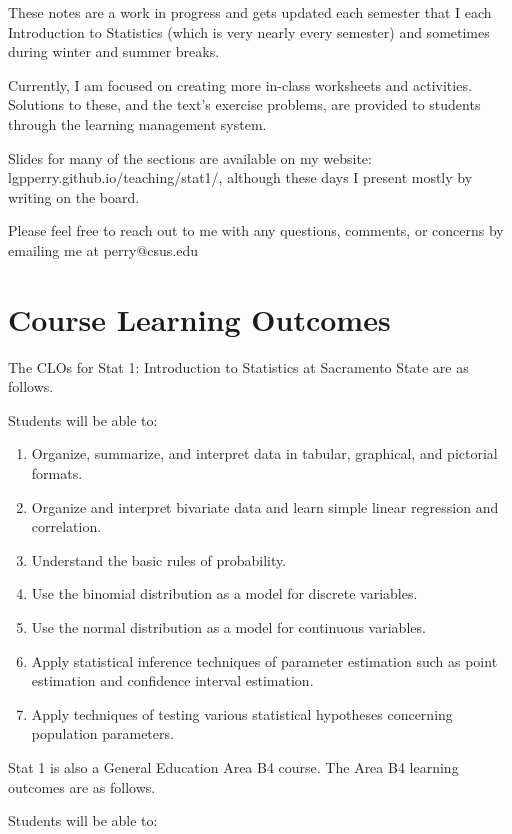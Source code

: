 \documentclass[
]{book}
\providecommand{\tightlist}{%
  \setlength{\itemsep}{0pt}\setlength{\parskip}{0pt}}
\begin{document}
These notes are a work in progress and gets updated each semester that I each Introduction to Statistics (which is very nearly every semester) and sometimes during winter and summer breaks.

Currently, I am focused on creating more in-class worksheets and activities. Solutions to these, and the text's exercise problems, are provided to students through the learning management system.

Slides for many of the sections are available on my website: lgpperry.github.io/teaching/stat1/, although these days I present mostly by writing on the board.

Please feel free to reach out to me with any questions, comments, or concerns by emailing me at perry@csus.edu

\section*{Course Learning Outcomes}\label{course-learning-outcomes}

The CLOs for Stat 1: Introduction to Statistics at Sacramento State are as follows.

Students will be able to:

\begin{enumerate}
\def\labelenumi{\arabic{enumi}.}
\tightlist
\item
  Organize, summarize, and interpret data in tabular, graphical, and pictorial formats.
\item
  Organize and interpret bivariate data and learn simple linear regression and correlation.
\item
  Understand the basic rules of probability.
\item
  Use the binomial distribution as a model for discrete variables.
\item
  Use the normal distribution as a model for continuous variables.
\item
  Apply statistical inference techniques of parameter estimation such as point estimation and confidence interval estimation.
\item
  Apply techniques of testing various statistical hypotheses concerning population parameters.
\end{enumerate}

Stat 1 is also a General Education Area B4 course. The Area B4 learning outcomes are as follows.

Students will be able to:
\end{document}
